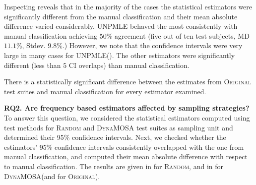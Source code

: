 \documentclass[sigconf,review,anonymous]{acmart}
\newcommand{\projectCount}{ten\xspace}
\newcommand{\Unpmle}{UNPMLE\xspace}
\newcommand{\original}{\textsc{Original}\xspace}
\newcommand{\EvosuiteRandom}{\textsc{Random}\xspace}
\newcommand{\EvosuiteDynamosa}{\textsc{DynaMOSA}\xspace}
\begin{document}
Inspecting  reveals that in the majority of the cases the
statistical estimators were significantly different from the manual classification
and their mean absolute difference varied considerably.
\Unpmle behaved the most consistently with manual classification
achieving 50\% agreement (five out of \projectCount test subjects,
MD $11.1$\%, Stdev. 9.8\%.) However, we note that the confidence
intervals were very large in many cases for \Unpmle ().
%
%
The other estimators were significantly different %
(less than $5$ CI overlaps)
 than manual classification.

\begin{tcolorbox}[boxrule=0.5pt, arc=4pt, boxsep=0pt, width=\columnwidth]
There is a statistically significant difference between the estimates
from \original test suites and manual classification for
every estimator examined.
\end{tcolorbox}

\noindent\textbf{RQ2.
Are frequency based estimators affected by sampling strategies?}\\
%
To answer this question, we considered the statistical estimators computed
using test methods for \EvosuiteRandom and \EvosuiteDynamosa test suites as sampling unit
and determined their 95\% confidence intervals.
%
Next, we checked whether the estimators' 95\% confidence intervals consistently
overlapped with the one from manual classification, and computed their mean absolute
difference with respect to manual classification.
%
The results are given in  for \EvosuiteRandom, and in
 for \EvosuiteDynamosa (and  for \original).
\end{document}
